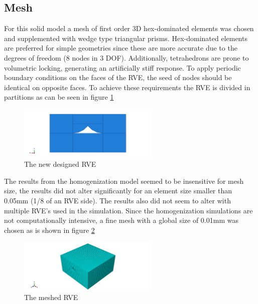 \subsection{Mesh}
For this solid model a mesh of first order 3D hex-dominated elements was chosen and supplemented with wedge type triangular prisms. Hex-dominated elements are preferred for simple geometries since these are more accurate due to the degrees of freedom (8 nodes in 3 DOF). Additionally, tetrahedrons are prone to volumetric locking, generating an artificially stiff response. 
To apply periodic boundary conditions on the faces of the RVE, the seed of nodes should be identical on opposite faces. To achieve these requirements the RVE is divided in partitions as can be seen in figure \ref{fig:partition}
\begin{figure}[H]
    \centering
    \includegraphics[width=0.60\textwidth]{chapter_6_Elasticmodelling/figures/partition.png}
    \caption{The new designed RVE}
    \label{fig:partition}
\end{figure}
The results from the homogenization model seemed to be insensitive for mesh size, the results did not alter significantly for an element size smaller than 0.05mm (1/8 of an RVE side). The results also did not seem to alter with multiple RVE's used in the simulation. Since the homogenization simulations are not computationally intensive, a fine mesh with a global size of 0.01mm was chosen as is shown in figure \ref{fig:mesh}

\begin{figure}[H]
    \centering
    \includegraphics[width=0.60\textwidth]{chapter_6_Elasticmodelling/figures/mesh.png}
    \caption{The meshed RVE}
    \label{fig:mesh}
\end{figure}
